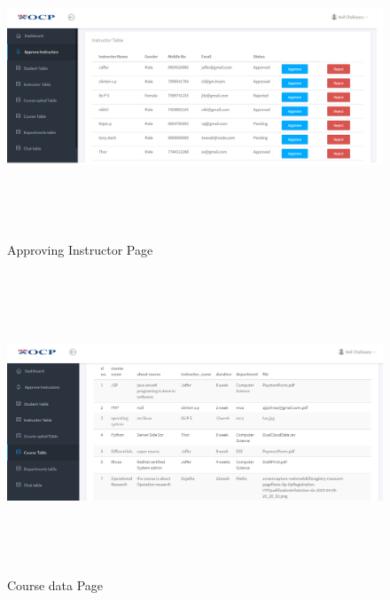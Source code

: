\begin{figure}[!h]
	\begin{center}
		\includegraphics[width=16cm,height=9cm]{approveInstructor.png}
	\end{center}
\caption{Approving Instructor Page}
\end{figure}

\begin{figure}[!h]
	\begin{center}
		\includegraphics[width=16cm,height=9cm]{coursedata.png}
	\end{center}
\caption{ Course data Page}
\end{figure}

